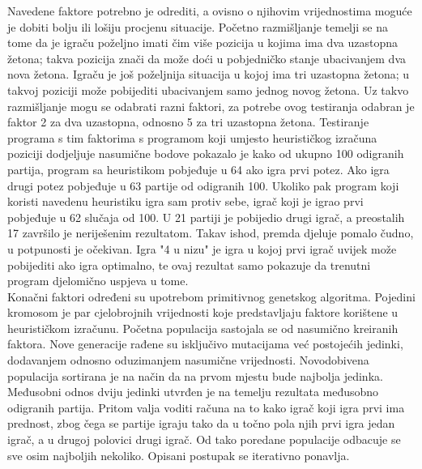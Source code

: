 \documentclass[times, utf8, seminar, numeric, tikz]{fer}
\begin{document}
Navedene faktore potrebno je odrediti, a ovisno o njihovim vrijednostima moguće je dobiti bolju ili lošiju procjenu situacije. Početno razmišljanje temelji se na tome da je igraču poželjno imati čim više pozicija u kojima ima dva uzastopna žetona; takva pozicija znači da može doći u pobjedničko stanje ubacivanjem dva nova žetona. Igraču je još poželjnija situacija u kojoj ima tri uzastopna žetona; u takvoj poziciji može pobijediti ubacivanjem samo jednog novog žetona. Uz takvo razmišljanje mogu se odabrati razni faktori, za potrebe ovog testiranja odabran je faktor 2 za dva uzastopna, odnosno 5 za tri uzastopna žetona. Testiranje programa s tim faktorima s programom koji umjesto heurističkog izračuna poziciji dodjeljuje nasumične bodove pokazalo je kako od ukupno 100 odigranih partija, program sa heuristikom pobjeđuje u 64 ako igra prvi potez. Ako igra drugi potez pobjeđuje u 63 partije od odigranih 100. Ukoliko pak program koji koristi navedenu heuristiku igra sam protiv sebe, igrač koji je igrao prvi pobjeđuje u 62 slučaja od 100. U 21 partiji je pobijedio drugi igrač, a preostalih 17 završilo je neriješenim rezultatom. Takav ishod, premda djeluje pomalo čudno, u potpunosti je očekivan. Igra "4 u nizu" je igra u kojoj prvi igrač uvijek može pobijediti ako igra optimalno, te ovaj rezultat samo pokazuje da trenutni program djelomično uspjeva u tome. \\

Konačni faktori određeni su upotrebom primitivnog genetskog algoritma. Pojedini kromosom je par cjelobrojnih vrijednosti koje predstavljaju faktore korištene u heurističkom izračunu. Početna populacija sastojala se od nasumično kreiranih faktora. Nove generacije rađene su isključivo mutacijama već postojećih jedinki, dodavanjem odnosno oduzimanjem nasumične vrijednosti. Novodobivena populacija sortirana je na način da na prvom mjestu bude najbolja jedinka. Međusobni odnos dviju jedinki utvrđen je na temelju rezultata međusobno odigranih partija. Pritom valja voditi računa na to kako igrač koji igra prvi ima prednost, zbog čega se partije igraju tako da u točno pola njih prvi igra jedan igrač, a u drugoj polovici drugi igrač. Od tako poredane populacije odbacuje se sve osim najboljih nekoliko. Opisani postupak se iterativno ponavlja.\\
\end{document}
